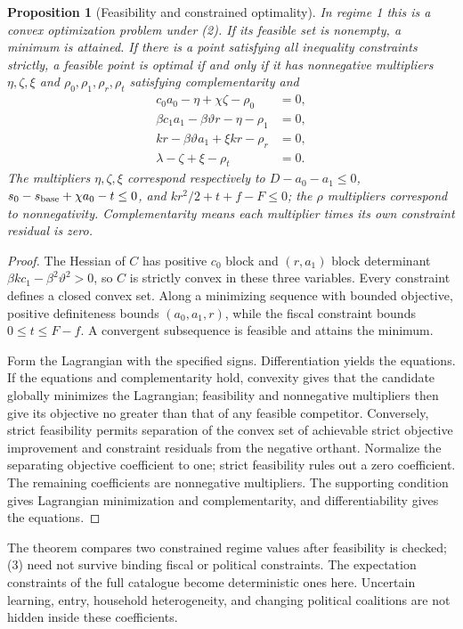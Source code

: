 \documentclass[11pt,a4paper]{article}
\newtheorem{proposition}[theorem]{Proposition}
\theoremstyle{remark}
\begin{document}
\begin{proposition}[Feasibility and constrained optimality]
In regime 1 this is a convex optimization problem under (2). If its feasible set is nonempty, a minimum is attained. If there is a point satisfying all inequality constraints strictly, a feasible point is optimal if and only if it has nonnegative multipliers $\eta,\zeta,\xi$ and $\rho_0,\rho_1,\rho_r,\rho_t$ satisfying complementarity and
\begin{align*}
 c_0a_0-\eta+\chi\zeta-\rho_0&=0,\\
 \beta c_1a_1-\beta\vartheta r-\eta-\rho_1&=0,\\
 kr-\beta\vartheta a_1+\xi kr-\rho_r&=0,\\
 \lambda-\zeta+\xi-\rho_t&=0.
\end{align*}
The multipliers $\eta,\zeta,\xi$ correspond respectively to $D-a_0-a_1\le0$, $s_0-s_{\rm base}+\chi a_0-t\le0$, and $kr^2/2+t+f-F\le0$; the $\rho$ multipliers correspond to nonnegativity. Complementarity means each multiplier times its own constraint residual is zero.
\end{proposition}
\begin{proof}
The Hessian of $C$ has positive $c_0$ block and $(r,a_1)$ block determinant $\beta k c_1-\beta^2\vartheta^2>0$, so $C$ is strictly convex in these three variables. Every constraint defines a closed convex set. Along a minimizing sequence with bounded objective, positive definiteness bounds $(a_0,a_1,r)$, while the fiscal constraint bounds $0\le t\le F-f$. A convergent subsequence is feasible and attains the minimum.

Form the Lagrangian with the specified signs. Differentiation yields the equations. If the equations and complementarity hold, convexity gives that the candidate globally minimizes the Lagrangian; feasibility and nonnegative multipliers then give its objective no greater than that of any feasible competitor. Conversely, strict feasibility permits separation of the convex set of achievable strict objective improvement and constraint residuals from the negative orthant. Normalize the separating objective coefficient to one; strict feasibility rules out a zero coefficient. The remaining coefficients are nonnegative multipliers. The supporting condition gives Lagrangian minimization and complementarity, and differentiability gives the equations.
\end{proof}

The theorem compares two constrained regime values after feasibility is checked; (3) need not survive binding fiscal or political constraints. The expectation constraints of the full catalogue become deterministic ones here. Uncertain learning, entry, household heterogeneity, and changing political coalitions are not hidden inside these coefficients.
\end{document}
